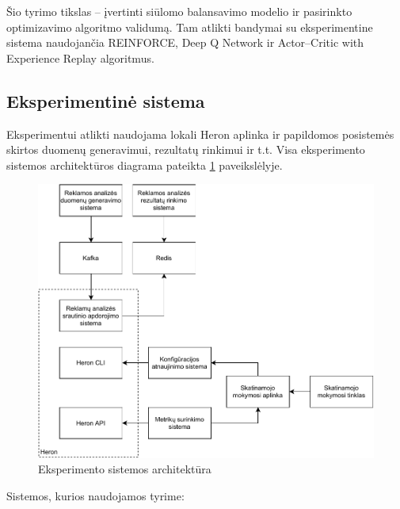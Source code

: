 \documentclass{VUMIFPSbakalaurinis}
\begin{document}
Šio tyrimo tikslas – įvertinti siūlomo balansavimo modelio ir pasirinkto optimizavimo algoritmo validumą. Tam atlikti bandymai su eksperimentine sistema naudojančia REINFORCE, Deep Q Network ir Actor–Critic with Experience Replay algoritmus.

\subsection{Eksperimentinė sistema}

Eksperimentui atlikti naudojama lokali Heron aplinka ir papildomos posistemės skirtos duomenų generavimui, rezultatų rinkimui ir t.t. Visa eksperimento sistemos architektūros diagrama pateikta \ref{experiment} paveikslėlyje.

\begin{figure}[H]
    \includegraphics[width=16cm]{img/Experiment.pdf}
    \caption{Eksperimento sistemos architektūra}
    \label{experiment}
\end{figure} 
\pagebreak
Sistemos, kurios naudojamos tyrime:
\end{document}

